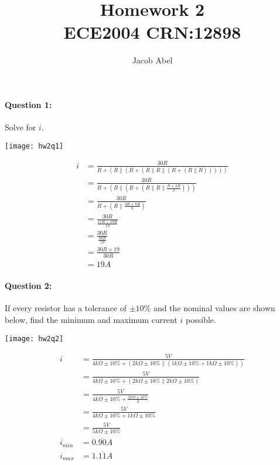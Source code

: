 \documentclass[12pt,letterpaper,titlepage]{article}
\author{Jacob Abel}
\title{	Homework 2
	\\\large ECE2004 CRN:12898
}
\begin{document}
\maketitle

\begin{raggedright}

\paragraph{Question 1: }

Solve for $i$.

\begin{center}
\texttt{[image: hw2q1]}
\end{center}

\begin{align*}
   i &= \frac{30R}{R + (R \parallel ( R + (R \parallel R \parallel (R + ( R \parallel R)))))}
\\   &= \frac{30R}{R + (R \parallel ( R + (R \parallel R \parallel \frac{R+2R}{2})))}
\\   &= \frac{30R}{R + (R \parallel \frac{3R+8R}{8})}
\\   &= \frac{30R}{\frac{11R+19R}{19}}
\\   &= \frac{30R}{\frac{30R}{19}}
\\   &= \frac{30R\times19}{30R}
\\   &= 19A
\end{align*}

\clearpage

\paragraph{Question 2: }

If every resistor has a tolerance of $\pm 10\%$ and the nominal values are shown below, find the minimum and maximum current $i$ possible.

\begin{center}
\texttt{[image: hw2q2]}
\end{center}
\begin{align*}
    i &= \frac{5V}{4 k\Omega \pm 10\% + (2 k\Omega \pm 10\% \parallel (1 k\Omega \pm 10\% + 1 k\Omega \pm 10\%))}
\\    &= \frac{5V}{4 k\Omega \pm 10\% + (2 k\Omega \pm 10\% \parallel 2 k\Omega \pm 10\%)}
\\    &= \frac{5V}{4 k\Omega \pm 10\% + \frac{2 k\Omega \pm 10\%}{2}}
\\    &= \frac{5V}{4 k\Omega \pm 10\% + 1 k\Omega \pm 10\%}
\\    &= \frac{5V}{5 k\Omega \pm 10\%}
\\ i_{min} &= 0.\overline{90}A
\\ i_{max} &= 1.\overline{11}A
\end{align*}


\end{raggedright}
\end{document}
